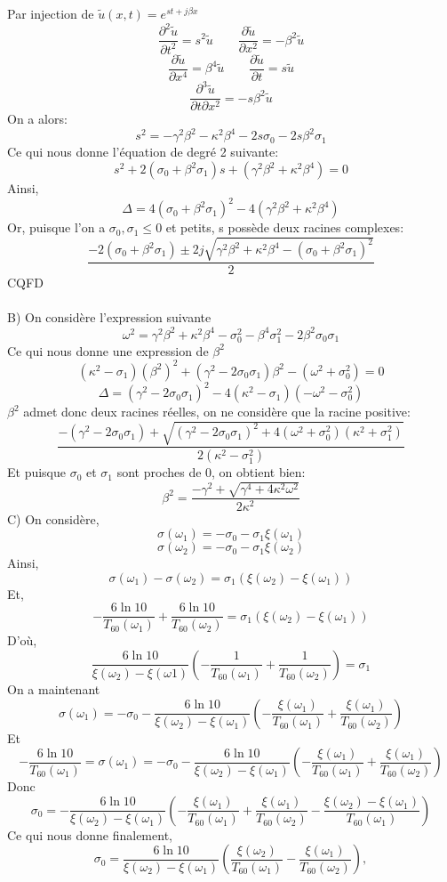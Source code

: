 \documentclass[a4,12pt]{article}
\begin{document}
\begin{mdframed}[style=exempledefault,backgroundcolor=green!60]
Par injection de $\tilde u(x,t)=e^{st+j\beta x}$
\[
    \frac{\partial ^2\tilde u}{\partial t^2}=s^2\tilde u \quad\quad \frac{\partial\tilde u}{\partial x^2}=-\beta^2 \tilde u
\]
\[
    \frac{\partial\tilde u}{\partial x^4}=\beta^4 \tilde u \quad\quad \frac{\partial\tilde u}{\partial t}=s\tilde u
\]
\[
    \frac{\partial^3 \tilde u}{\partial t\partial x^2}=-s\beta^2 \tilde u
\]
On a alors:
\[
    s^2=-\gamma^2 \beta^2 -\kappa^2 \beta^4 -2s\sigma_{0} -2s\beta^2 \sigma_{1}
\]
Ce qui nous donne l'équation de degré 2 suivante:
\[
    s^2 +2(\sigma_{0}+\beta^2 \sigma_{1})s +(\gamma^2\beta^2+\kappa^2\beta^4)=0
\]
Ainsi,
\[
    \Delta=4(\sigma_{0}+\beta^2\sigma_{1})^2-4(\gamma^2\beta^2+\kappa^2\beta^4)
\]
Or, puisque l'on a $\sigma_{0},\sigma_{1} \leqslant 0$ et petits, s possède deux racines complexes:
\[
    \frac{-2(\sigma_{0}+\beta^2 \sigma_{1})\pm2j\sqrt{\gamma^2 \beta^2+\kappa^2 \beta^4 -(\sigma_{0}+\beta^2 \sigma_{1})^2}}{2}
\]
\large{CQFD}\\\\
B) On considère l'expression suivante
\[
    \omega^2=\gamma^2\beta^2+\kappa^2\beta^4-\sigma_{0}^2-\beta^4\sigma_{1}^2-2\beta^2\sigma_{0}\sigma_{1}
\]
Ce qui nous donne une expression de $\beta^2$
\[
    (\kappa^2-\sigma_{1})(\beta^2)^2+(\gamma^2-2\sigma_{0}\sigma_{1})\beta^2-(\omega^2+\sigma_{0}^2)=0
\]
\[
    \Delta=(\gamma^2-2\sigma_{0}\sigma_{1})^2-4(\kappa^2-\sigma_{1})(-\omega^2-\sigma_{0}^2)
\]
$\beta^2$ admet donc deux racines réelles, on ne considère que la racine positive:
\[
\frac{-(\gamma^2-2\sigma_{0}\sigma_{1})+\sqrt{(\gamma^2-2\sigma_{0}\sigma_{1})^2+4(\omega^2+\sigma_{0}^2)(\kappa^2+\sigma_{1}^2)}}{2(\kappa^2-\sigma_{1}^2)}
 \]
 Et puisque $\sigma_{0}$ et $\sigma_{1}$ sont proches de 0, on obtient bien:
 \[
    \beta^2=\frac{-\gamma^2+\sqrt{\gamma^4+4\kappa^2 \omega^2}}{2\kappa^2}
 \]
 C) On considère,
 \[
     \sigma(\omega_{1})=-\sigma_{0}-\sigma_{1}\xi(\omega_{1})
 \]
 \[
     \sigma(\omega_{2})=-\sigma_{0}-\sigma_{1}\xi(\omega_{2})
 \]
 Ainsi,
 \[
     \sigma(\omega_{1})-\sigma(\omega_{2})=\sigma_{1}(\xi(\omega_{2})-\xi(\omega_{1}))
 \]
 Et,
 \[
     -\frac{6\ln{10}}{T_{60}(\omega_{1})}+\frac{6\ln{10}}{T_{60}(\omega_{2})}=\sigma_{1}(\xi(\omega_{2})-\xi(\omega_{1}))
 \]
 D'où,
 \[
     \frac{6\ln{10}}{\xi(\omega_{2})-\xi(\omega{1})}(-\frac{1}{T_{60}(\omega_{1})}+\frac{1}{T_{60}(\omega_{2})})=\sigma_{1}
 \]
 On a maintenant
 \[
     \sigma(\omega_{1})=-\sigma_{0}-\frac{6\ln{10}}{\xi(\omega_{2})-\xi(\omega_{1})}(-\frac{\xi(\omega_{1})}{T_{60}(\omega_{1})}+\frac{\xi(\omega_{1})}{T_{60}(\omega_{2})})
 \]
 Et
 \[
     -\frac{6\ln{10}}{T_{60}(\omega_{1})}=\sigma(\omega_{1})=-\sigma_{0}-\frac{6\ln{10}}{\xi(\omega_{2})-\xi(\omega_{1})}(-\frac{\xi(\omega_{1})}{T_{60}(\omega_{1})}+\frac{\xi(\omega_{1})}{T_{60}(\omega_{2})})
 \]
 Donc
 \[
     \sigma_{0}=-\frac{6\ln{10}}{\xi(\omega_{2})-\xi(\omega_{1})}(-\frac{\xi(\omega_{1})}{T_{60}(\omega_{1})}+\frac{\xi(\omega_{1})}{T_{60}(\omega_{2})}-\frac{\xi(\omega_{2})-\xi(\omega_{1})}{T_{60}(\omega_{1})})
 \]
 Ce qui nous donne finalement,
 \[
    \sigma_0=\frac{6 \ln 10}{\xi(\omega_2)-\xi(\omega_1)}\left(\frac{\xi(\omega_2)}{T_{60}(\omega_1)}-\frac{\xi(\omega_1)}{T_{60}(\omega_2)}\right),
 \]
\end{mdframed}
\end{document}
